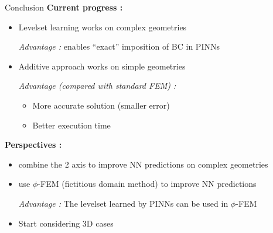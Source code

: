 \begin{frame}[label={lastslide}]{Conclusion}
	\textbf{Current progress :}
	\begin{itemize}[]
		\item Levelset learning works on complex geometries
		
		\textit{Advantage :} enables “exact” imposition of BC in PINNs
		
		\item Additive approach works on simple geometries
		
		\textit{Advantage (compared with standard FEM) :}
		\begin{itemize}[-]
			\item More accurate solution (smaller error) 
			\item Better execution time
		\end{itemize}
	\end{itemize}
	
	\textbf{Perspectives :}
	\begin{itemize}[]
		\item combine the 2 axis to improve NN predictions on complex geometries 
		\item use $\phi$-FEM (fictitious domain method) to improve NN predictions
		
		\textit{Advantage :} The levelset learned by PINNs can be used in $\phi$-FEM
		\item Start considering 3D cases
	\end{itemize}
\end{frame}

